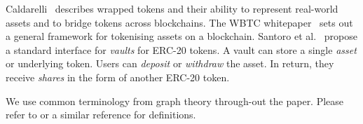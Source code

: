 Caldarelli~\cite{caldarelli-21} describes wrapped tokens and their
ability to represent real-world assets and to bridge tokens across
blockchains.  The WBTC whitepaper~\cite{kyber-et-al-xx} sets out a
general framework for tokenising assets on a blockchain.  Santoro et
al.~\cite{santoro-et-al-22} propose a standard interface for
\textit{vaults} for ERC-20 tokens.  A vault can store a single
\textit{asset} or underlying token.  Users can \textit{deposit} or
\textit{withdraw} the asset.  In return, they receive \textit{shares}
in the form of another ERC-20 token.


We use common terminology from graph theory through-out the paper.
Please refer to \cite{diestel-17} or a similar reference for
definitions.
